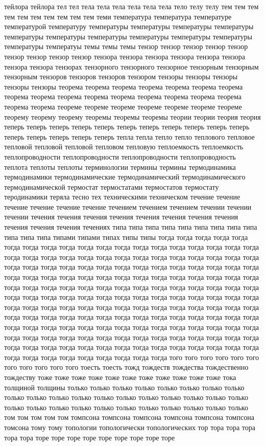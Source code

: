 тейлора тейлора тел тел тела тела тела тела тела тела тело телу телу тем тем тем тем тем тем тем тем тем тем теми температура температура температуре температурой температуру температуры температуры температуры температуры температуры температуры температуры температуры температуры температуры температуры температуы темы темы темы тензор тензор тензор тензор тензор тензор тензор тензор тензор тензора тензора тензора тензора тензора тензора тензора тензора тензорах тензорного тензорного тензорное тензорным тензорным тензорным тензоров тензоров тензоров тензором тензоры тензоры тензоры тензоры тензоры теорема теорема теорема теорема теорема теорема теорема теорема теорема теорема теорема теорема теорема теорема теорема теорема теорема теорема теореме теореме теореме теореме теореме теореме теореме теорему теорему теорему теоремы теоремы теоремы теории теории теория теория теперь теперь теперь теперь теперь теперь теперь теперь теперь теперь теперь теперь теперь теперь теперь теперь тепла тепла тепло тепло теплового тепловое тепловой тепловой тепловой тепловом тепловую теплоемкость теплоемкость теплопроводности теплопроводности теплопроводности теплопроводность теплота теплоты теплоты терминологии термины термины термодинамика термодинамики термодинамические термодинамический термодинамического термодинамической термостат термостатами термостатов термостату теродинамики теряла тесно тех техническими техническом течение течение течение течение течение течение течением течением течением течении течении течении течения течения течения течения течения течения течения течения течения течения течения течениях типа типа типа типа типа типа типа типа типа типа типа типа типами типами типах типы типы тогда тогда тогда тогда тогда тогда тогда тогда тогда тогда тогда тогда тогда тогда тогда тогда тогда тогда тогда тогда тогда тогда тогда тогда тогда тогда тогда тогда тогда тогда тогда тогда тогда тогда тогда тогда тогда тогда тогда тогда тогда тогда тогда тогда тогда тогда тогда тогда тогда тогда тогда тогда тогда тогда тогда тогда тогда тогда тогда тогда тогда тогда тогда тогда тогда тогда тогда тогда тогда тогда тогда тогда тогда тогда тогда тогда тогда тогда тогда тогда тогда тогда тогда тогда тогда тогда тогда тогда тогда тогда тогда тогда тогда тогда тогда тогда тогда тогда тогда тогда тогда тогда тогда тогда тогда тогда тогда тогда тогда тогда тогда тогда тогда тогда тогда тогда тогда тогда тогда тогда тогда тогда тогда тогда тогда тогда тогда тогда тогда тогда тогда тогда тогда тогда тогда тогда тогда тогда тогда тогда тогда тогда тогда тогда тогда тогда тогда тогда тогда тогда тогда тогда тогда тогда тогда тогда тогда тогда тогда тогда тогда тогда тогда тогда тогда тогда тогда тогда того того того того того того того того того того того тоесть тоесть тожд тождеств тождества тождественно тождеству тоже тоже тоже тоже тоже тоже тоже тоже тоже тоже тоже тока толщиной толщины только только только только только только только только только только только только только только только только только только только только только только только только только только только только только только том том том том том томпсона томпсона томпсона томпсона томпсона томпсона томсона тому тому топологии топологически топологических тор тора тора тора тора тора торе торе торе торе торе торе торе торе торе 